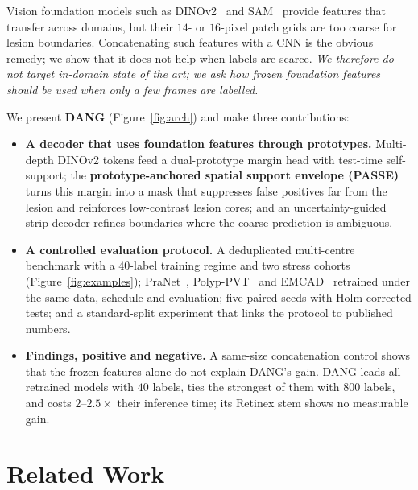 \documentclass[10pt,twocolumn]{article}
\begin{document}
Vision foundation models such as DINOv2~\citep{oquab2024dinov2} and SAM~\citep{kirillov2023segment} provide features that transfer across domains, but their $14$- or $16$-pixel patch grids are too coarse for lesion boundaries. Concatenating such features with a CNN is the obvious remedy; we show that it does not help when labels are scarce. \emph{We therefore do not target in-domain state of the art; we ask how frozen foundation features should be used when only a few frames are labelled.}

We present \textbf{DANG} (Figure~\ref{fig:arch}) and make three contributions:
\begin{itemize}
  \item \textbf{A decoder that uses foundation features through prototypes.} Multi-depth DINOv2 tokens feed a dual-prototype margin head with test-time self-support; the \textbf{prototype-anchored spatial support envelope (PASSE)} turns this margin into a mask that suppresses false positives far from the lesion and reinforces low-contrast lesion cores; and an uncertainty-guided strip decoder refines boundaries where the coarse prediction is ambiguous.
  \item \textbf{A controlled evaluation protocol.} A deduplicated multi-centre benchmark with a $40$-label training regime and two stress cohorts (Figure~\ref{fig:examples}); PraNet~\citep{fan2020pranet}, Polyp-PVT~\citep{dong2021polyp} and EMCAD~\citep{rahman2024emcad} retrained under the same data, schedule and evaluation; five paired seeds with Holm-corrected tests; and a standard-split experiment that links the protocol to published numbers.
  \item \textbf{Findings, positive and negative.} A same-size concatenation control shows that the frozen features alone do not explain DANG's gain. DANG leads all retrained models with $40$ labels, ties the strongest of them with $800$ labels, and costs $2$--$2.5\times$ their inference time; its Retinex stem shows no measurable gain.
\end{itemize}

\section{Related Work}
\end{document}
